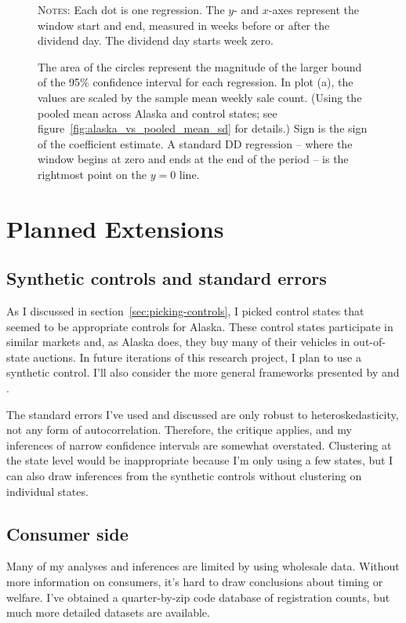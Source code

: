 \documentclass[11pt,letterpaper,oneside]{article}
\newcommand{\varWindowDDnotes}{%
Each dot is one regression.
The $y$- and $x$-axes represent the window start and end, measured in weeks before or after the dividend day.
The dividend day starts week zero.

 The area of the circles represent the magnitude of the larger bound of the 95\% confidence interval for each regression.
In plot (a), the values are scaled by the sample mean weekly sale count.
(Using the pooled mean across Alaska and control states; see figure~\ref{fig:alaska_vs_pooled_mean_sd} for details.)
Sign is the sign of the coefficient estimate. %
A standard DD regression -- where the window begins at zero and ends at the end of the period -- is the rightmost point on the $y=0$ line.
}
\begin{document}
\begin{doublespacing}
\begin{figure}[!hbtp]
    {\footnotesize
    \textsc{Notes:}
    \varWindowDDnotes
    }
\end{figure}


\section{Planned Extensions}

\subsection{Synthetic controls and standard errors}
\label{sec:synthetic-controls}
As I discussed in section~\ref{sec:picking-controls},  I picked control states that seemed to be appropriate controls for Alaska.
These control states participate in similar markets and, as Alaska does, they buy many of their vehicles in out\hyp{}of\hyp{}state auctions.
In future iterations of this research project, I plan to use a synthetic control.
I'll also consider the more general frameworks presented by
\textcite{DoudchenkoImbens2016DD} and \textcite{Xu2016}.

The standard errors I've used and discussed are only robust to heteroskedasticity, not any form of autocorrelation.
Therefore, the \textcite{bertrand_duflo2004DD} critique applies, and my inferences of narrow confidence intervals are somewhat overstated.
Clustering at the state level would be inappropriate because I'm only using a few states, but I can also draw inferences from the synthetic controls without clustering on individual states.
%


\subsection{Consumer side}
Many of my analyses and inferences are limited by using wholesale data.
Without more information on consumers, it's hard to draw conclusions about timing or welfare.
I've obtained a quarter\hyp{}by\hyp{}zip code database of registration counts, but much more detailed datasets are available.
%

\end{doublespacing}
\end{document}
